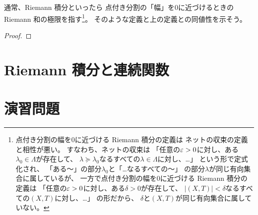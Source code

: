 \documentclass[report]{jlreq}
\begin{document}
通常、Riemann 積分といったら
点付き分割の「幅」を$0$に近づけるときの Riemann 和の極限を指す\footnote{
    点付き分割の幅を$0$に近づける Riemann 積分の定義は
    ネットの収束の定義と相性が悪い。
    すなわち、ネットの収束は
    「任意の$\varepsilon > 0$に対し、ある$\lambda_0 \in \Lambda$が存在して、
    $\lambda \succeq \lambda_0$なるすべての$\lambda \in \Lambda$に対し、…」
    という形で定式化され、
    「ある〜」の部分$\lambda_0$と「…なるすべての〜」
    の部分$\lambda$が同じ有向集合に属しているが、
    一方で点付き分割の幅を$0$に近づける Riemann 積分の定義は
    「任意の$\varepsilon > 0$に対し、ある$\delta > 0$が存在して、
    $|(X, T)| < \delta$なるすべての$(X, T)$に対し、…」
    の形だから、
    $\delta$と$(X, T)$が同じ有向集合に属していない。
}。
そのような定義と上の定義との同値性を示そう。

\begin{proposition}
    \TODO{}
\end{proposition}

\begin{proof}
    \TODO{}
\end{proof}

\begin{definition}[Darboux 積分]
    \TODO{}
\end{definition}


%
\section{Riemann 積分と連続関数}

\begin{proposition}
    \TODO{}
\end{proposition}

%
\newpage
\section{演習問題}

\begin{problem}[東大数理 2006A]
    
\end{problem}

\begin{answer}
    
\end{answer}
\end{document}
